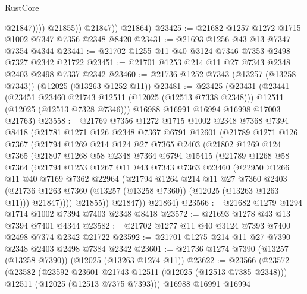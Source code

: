 \begin{lexlean}{RustCore}
\begin{coremodule}
                      @21847))))
              @21855))
          @21847))
      @21864)
@23425 := @21682 @1257 @1272 @1715 @1002 @7347 @7356 @2348 @8420
@23431 := @21693 @1256 @43 @13 @7347 @7354 @4344
@23441 := @21702 @1255 @11 @40 @3124 @7346 @7353 @2498 @7327 @2342 @21722
@23451 := @21701 @1253 @214 @11 @27 @7343 @2348 @2403 @2498 @7337 @2342
@23460 := @21736 @1252 @7343 (@13257 (@13258 @7343)) (@12025 (@13263 @1252 @11))
@23481 := @23425
    (@23431
      (@23441
        (@23451 @23460 @21743 @12511 (@12025 (@12513 @7338 @2348)))
        @12511
        (@12025 (@12513 @7328 @7346)))
      @16988
      @16991
      @16994
      @16998
      @17003
      @21763)
@23558 := @21769
    @7356
    @1272
    @1715
    @1002
    @2348
    @7368
    @7394
    @8418
    (@21781
      @1271
      @126
      @2348
      @7367
      @6791
      @12601
      (@21789
        @1271
        @126
        @7367
        (@21794
          @1269
          @214
          @124
          @27
          @7365
          @2403
          (@21802
            @1269
            @124
            @7365
            (@21807
              @1268
              @58
              @2348
              @7364
              @6794
              @15415
              (@21789
                @1268
                @58
                @7364
                (@21794
                  @1253
                  @1267
                  @11
                  @43
                  @7343
                  @7363
                  @23460
                  (@22950
                    @1266
                    @11
                    @40
                    @7169
                    @7362
                    @22964
                    (@21794
                      @1264
                      @214
                      @11
                      @27
                      @7360
                      @2403
                      (@21736 @1263 @7360 (@13257 (@13258 @7360)) (@12025 (@13263 @1263 @11)))
                      @21847))))
              @21855))
          @21847))
      @21864)
@23566 := @21682 @1279 @1294 @1714 @1002 @7394 @7403 @2348 @8418
@23572 := @21693 @1278 @43 @13 @7394 @7401 @4344
@23582 := @21702 @1277 @11 @40 @3124 @7393 @7400 @2498 @7374 @2342 @21722
@23592 := @21701 @1275 @214 @11 @27 @7390 @2348 @2403 @2498 @7384 @2342
@23601 := @21736 @1274 @7390 (@13257 (@13258 @7390)) (@12025 (@13263 @1274 @11))
@23622 := @23566
    (@23572
      (@23582
        (@23592 @23601 @21743 @12511 (@12025 (@12513 @7385 @2348)))
        @12511
        (@12025 (@12513 @7375 @7393)))
      @16988
      @16991
      @16994

\end{coremodule}
\end{lexlean}
